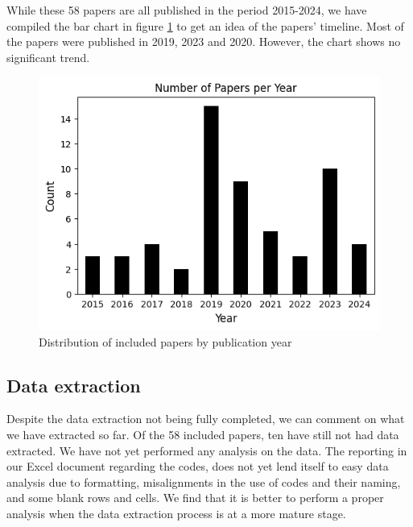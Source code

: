 While these 58 papers are all published in the period 2015-2024, we have compiled the bar chart in figure \ref{fig:papersbyyear} to get an idea of the papers' timeline. Most of the papers were published in 2019, 2023 and 2020. However, the chart shows no significant trend.

\begin{figure}[h!]
    \centering
    \includegraphics[width=\linewidth]{figures/papers-by-year.png}
    \caption{Distribution of included papers by publication year}
    \label{fig:papersbyyear}
\end{figure}

\subsection{Data extraction}
Despite the data extraction not being fully completed, we can comment on what we have extracted so far. Of the 58 included papers, ten have still not had data extracted. We have not yet performed any analysis on the data. The reporting in our Excel document regarding the codes, does not yet lend itself to easy data analysis due to formatting, misalignments in the use of codes and their naming, and some blank rows and cells. We find that it is better to perform a proper analysis when the data extraction process is at a more mature stage.

